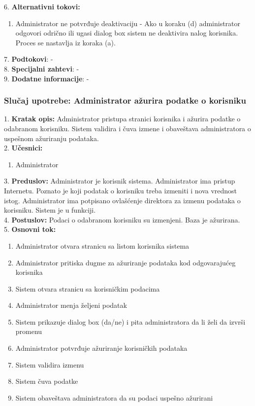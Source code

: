 \documentclass{article}
\begin{document}
6. \textbf{Alternativni tokovi:}
\begin{enumerate} [label=(\roman*)]
    \item Administrator ne potvrđuje deaktivaciju - Ako u koraku (d) administrator odgovori odrično ili ugasi dialog box sistem ne deaktivira nalog korisnika. Proces se nastavlja iz koraka (a).
\end{enumerate}

7. \textbf{Podtokovi}: - \\

8. \textbf{Specijalni zahtevi}: - \\

9. \textbf{Dodatne informacije}: - \\

\subsubsection{Slučaj upotrebe: Administrator ažurira podatke o korisniku}
1. \textbf{Kratak opis:} Administrator pristupa stranici korisnika i ažurira podatke o odabranom korisniku. Sistem validira i čuva izmene i obaveštava administratora o uspešnom ažuriranju podataka. \\

2. \textbf{Učesnici:}
\begin{enumerate} [label=(\alph*)]
\item Administrator
\end{enumerate} 

3. \textbf{Preduslov:} Administrator je korisnik sistema. Administrator ima pristup Internetu. Poznato je koji podatak o korisniku treba izmeniti i nova vrednost istog. Administrator ima potpisano ovlašćenje direktora za izmenu podataka o korisniku. Sistem je u funkciji. \\

4. \textbf{Postuslov:} Podaci o odabranom korisniku su izmenjeni. Baza je ažurirana. \\

5. \textbf{Osnovni tok:} 
\begin{enumerate} [label=(\alph*)]
\item Administrator otvara stranicu sa listom korisnika sistema
\item Administrator pritiska dugme za ažuriranje podataka kod odgovarajućeg korisnika
\item Sistem otvara stranicu sa korisničkim podacima
\item Administrator menja željeni podatak
\item Sistem prikazuje dialog box (da/ne) i pita administratora da li želi da izvrši promenu
\item Administrator potvrđuje ažuriranje korisničkih podataka
\item Sistem validira izmenu
\item Sistem čuva podatke
\item Sistem obaveštava administratora da su podaci uspešno ažurirani
\end{enumerate}
\end{document}
